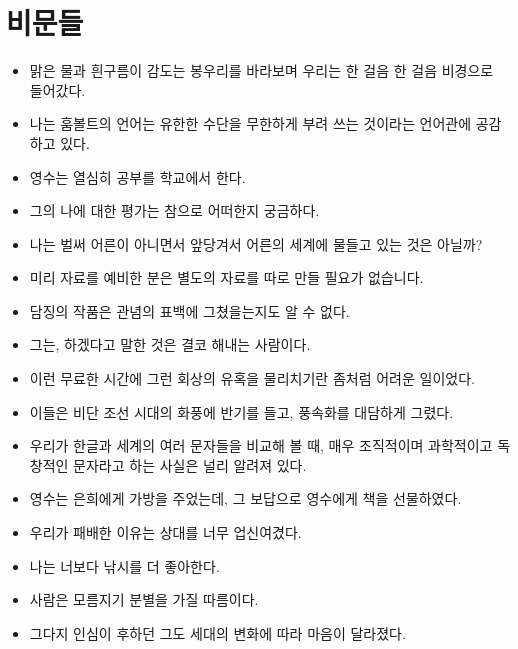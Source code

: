 \documentclass[10pt]{report}
\begin{document}
\section{비문들}
\begin{itemize}
\item
맑은 물과 흰구름이 감도는 봉우리를 바라보며 우리는 한 걸음 한 걸음 비경으로 들어갔다. 

\item
나는 훔볼트의 언어는 유한한 수단을 무한하게 부려 쓰는 것이라는 언어관에 공감하고 있다. 

\item
영수는 열심히 공부를 학교에서 한다. 

\item
그의 나에 대한 평가는 참으로 어떠한지 궁금하다. 

\item
나는 벌써 어른이 아니면서 앞당겨서 어른의 세계에 물들고 있는 것은 아닐까?

\item
미리 자료를 예비한 분은 별도의 자료를 따로 만들 필요가 없습니다.

\item
담징의 작품은 관념의 표백에 그쳤을는지도 알 수 없다. 

\item
그는, 하겠다고 말한 것은 결코 해내는 사람이다. 

\item
이런 무료한 시간에 그런 회상의 유혹을 물리치기란 좀처럼 어려운 일이었다. 

\item
이들은 비단 조선 시대의 화풍에 반기를 들고, 풍속화를 대담하게 그렸다. 

\item
우리가 한글과 세계의 여러 문자들을 비교해 볼 때, 매우 조직적이며 과학적이고 독창적인 문자라고 하는 사실은 널리 알려져 있다. 

\item
영수는 은희에게 가방을 주었는데, 그 보답으로 영수에게 책을 선물하였다. 

\item 
우리가 패배한 이유는 상대를 너무 업신여겼다.
\item
나는 너보다 낚시를 더 좋아한다. 

\item
사람은 모름지기 분별을 가질 따름이다. 

\item
그다지 인심이 후하던 그도 세대의 변화에 따라 마음이 달라졌다. 


\end{itemize}
\end{document}
